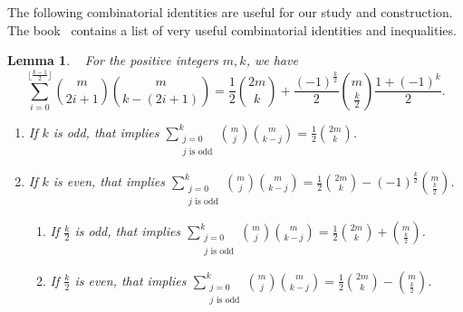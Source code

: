 \documentclass{article}[12pt]
\newtheorem{lemma}[theorem]{Lemma}
\begin{document}
The following combinatorial identities are useful for our study and construction. The book~\cite{G72} contains a list of very useful combinatorial identities and inequalities.
\begin{lemma}\label{lem:combid}~\cite[Item3.10]{G72} For the positive integers $m, k$, we have
$$\displaystyle{\sum_{i=0}^{\lfloor\frac{k-1}{2}\rfloor} {m \choose 2i+1 } {m \choose k-(2i+1)} = \frac{1}{2} {2m \choose k} + \frac{(-1)^\frac{k}{2}}{2}{m \choose \frac{k}{2}}\frac{1+(-1)^k}{2}}.$$
\begin{enumerate}
    \item\label{itm:combido} If $k$ is odd, that implies  $\displaystyle{\sum_{\substack{j=0 \\ j \text{ is odd}}}^k {m \choose j} {m \choose k-j} = \frac{1}{2} {2m \choose k}}$.
    \item\label{itm:combide} If $k$ is even, that implies  $\displaystyle{\sum_{\substack{j=0 \\ j \text{ is odd}}}^k {m \choose j} {m \choose k-j} = \frac{1}{2} {2m \choose k} - (-1)^\frac{k}{2}{m \choose \frac{k}{2}}}$.
    \begin{enumerate}
    \item \label{itm:combideo} If $\frac{k}{2}$ is odd, that implies  $\displaystyle{\sum_{\substack{j=0 \\ j \text{ is odd}}}^k {m \choose j} {m \choose k-j} = \frac{1}{2} {2m \choose k} + {m \choose \frac{k}{2}}}$.
    \item \label{itm:combidee} If $\frac{k}{2}$ is even, that implies  $\displaystyle{\sum_{\substack{j=0 \\ j \text{ is odd}}}^k {m \choose j} {m \choose k-j} = \frac{1}{2} {2m \choose k} - {m \choose \frac{k}{2}}}$.
    \end{enumerate}
\end{enumerate}
\end{lemma}
\end{document}
